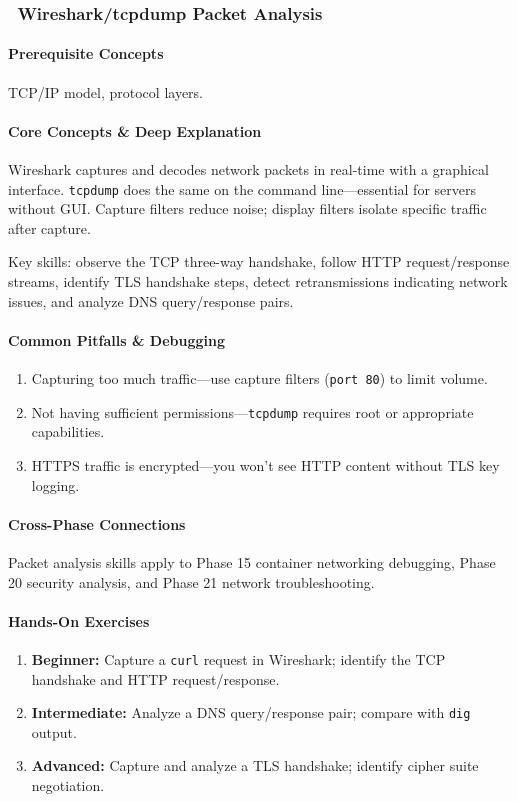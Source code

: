 \documentclass[11pt, a4paper, oneside]{report}
\newcommand{\mustmaster}[1]{\subsubsection{\texorpdfstring{\fcolorbox{blue!40!black}{blue!8}{\footnotesize\bfseries\color{blue!40!black} MUST MASTER}~#1}{#1}}}
\begin{document}
\mustmaster{Wireshark/tcpdump Packet Analysis}

\paragraph{Prerequisite Concepts} TCP/IP model, protocol layers.

\paragraph{Core Concepts \& Deep Explanation} Wireshark captures and decodes network packets in real-time with a graphical interface. \texttt{tcpdump} does the same on the command line---essential for servers without GUI. Capture filters reduce noise; display filters isolate specific traffic after capture.

Key skills: observe the TCP three-way handshake, follow HTTP request/response streams, identify TLS handshake steps, detect retransmissions indicating network issues, and analyze DNS query/response pairs.

\paragraph{Common Pitfalls \& Debugging}
\begin{enumerate}[leftmargin=*]
\item Capturing too much traffic---use capture filters (\texttt{port 80}) to limit volume.
\item Not having sufficient permissions---\texttt{tcpdump} requires root or appropriate capabilities.
\item HTTPS traffic is encrypted---you won't see HTTP content without TLS key logging.
\end{enumerate}

\paragraph{Cross-Phase Connections} Packet analysis skills apply to Phase 15 container networking debugging, Phase 20 security analysis, and Phase 21 network troubleshooting.

\paragraph{Hands-On Exercises}
\begin{enumerate}[leftmargin=*]
\item \textbf{Beginner:} Capture a \texttt{curl} request in Wireshark; identify the TCP handshake and HTTP request/response.
\item \textbf{Intermediate:} Analyze a DNS query/response pair; compare with \texttt{dig} output.
\item \textbf{Advanced:} Capture and analyze a TLS handshake; identify cipher suite negotiation.
\end{enumerate}
\end{document}
